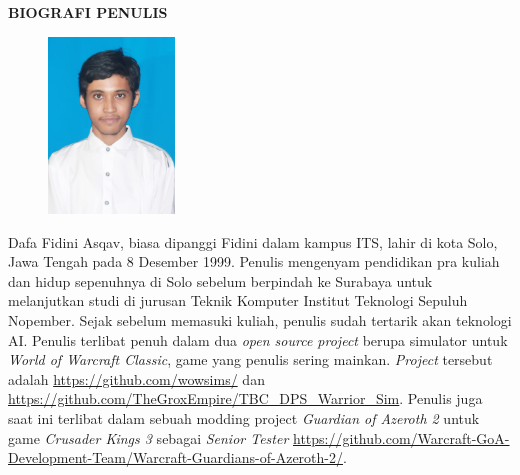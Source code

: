 \begin{center}
  \Large
  \textbf{BIOGRAFI PENULIS}
\end{center}


\vspace{2ex}

\begin{figure}
  \centering
  \vspace{-3ex}
  \includegraphics[width=0.3\textwidth]{gambar/portrait.JPG}
  \vspace{-4ex}
\end{figure}

Dafa Fidini Asqav, biasa dipanggi Fidini dalam kampus ITS, lahir di kota Solo, Jawa Tengah
pada 8 Desember 1999. Penulis mengenyam pendidikan pra kuliah dan hidup sepenuhnya di Solo
sebelum berpindah ke Surabaya untuk melanjutkan studi di jurusan Teknik Komputer Institut Teknologi
Sepuluh Nopember. Sejak sebelum memasuki kuliah, penulis sudah tertarik akan teknologi AI.
Penulis terlibat penuh dalam dua \emph{open source project} berupa simulator
untuk \emph{World of Warcraft Classic}, game yang penulis sering mainkan. \emph{Project} tersebut adalah
\url{https://github.com/wowsims/} dan \url{https://github.com/TheGroxEmpire/TBC_DPS_Warrior_Sim}.
Penulis juga saat ini terlibat dalam sebuah modding project \emph{Guardian of Azeroth 2} untuk
game \emph{Crusader Kings 3} sebagai \emph{Senior Tester} \url{https://github.com/Warcraft-GoA-Development-Team/Warcraft-Guardians-of-Azeroth-2/}.